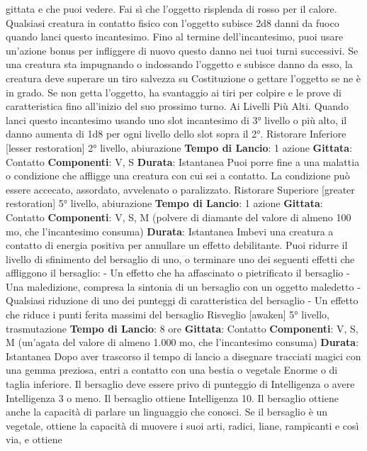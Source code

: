 \begin{multicols}{2}
gittata e che puoi vedere. Fai sì che l’oggetto risplenda
di rosso per il calore. Qualsiasi creatura in contatto
fisico con l’oggetto subisce 2d8 danni da fuoco quando
lanci questo incantesimo. Fino al termine
dell’incantesimo, puoi usare un’azione bonus per
infliggere di nuovo questo danno nei tuoi turni
successivi.
Se una creatura sta impugnando o indossando l’oggetto
e subisce danno da esso, la creatura deve superare un
tiro salvezza su Costituzione o gettare l’oggetto se ne è
in grado. Se non getta l’oggetto, ha svantaggio ai tiri per
colpire e le prove di caratteristica fino all’inizio del suo
prossimo turno.
Ai Livelli Più Alti. Quando lanci questo incantesimo
usando uno slot incantesimo di 3° livello o più alto, il
danno aumenta di 1d8 per ogni livello dello slot sopra il
2°.
Ristorare Inferiore
[lesser restoration]
2° livello, abiurazione
\textbf{Tempo di Lancio}: 1 azione
\textbf{Gittata}: Contatto
\textbf{Componenti}: V, S
\textbf{Durata}: Istantanea
Puoi porre fine a una malattia o condizione che affligge
una creatura con cui sei a contatto. La condizione può
essere accecato, assordato, avvelenato o paralizzato.
Ristorare Superiore
[greater restoration]
5° livello, abiurazione
\textbf{Tempo di Lancio}: 1 azione
\textbf{Gittata}: Contatto
\textbf{Componenti}: V, S, M (polvere di diamante del valore di
almeno 100 mo, che l’incantesimo consuma)
\textbf{Durata}: Istantanea
Imbevi una creatura a contatto di energia positiva per
annullare un effetto debilitante. Puoi ridurre il livello di
sfinimento del bersaglio di uno, o terminare uno dei
seguenti effetti che affliggono il bersaglio:
- Un effetto che ha affascinato o pietrificato il
bersaglio
- Una maledizione, compresa la sintonia di un
bersaglio con un oggetto maledetto
- Qualsiasi riduzione di uno dei punteggi di
caratteristica del bersaglio
- Un effetto che riduce i punti ferita massimi del
bersaglio
Risveglio
[awaken]
5° livello, trasmutazione
\textbf{Tempo di Lancio}: 8 ore
\textbf{Gittata}: Contatto
\textbf{Componenti}: V, S, M (un’agata del valore di almeno
1.000 mo, che l’incantesimo consuma)
\textbf{Durata}: Istantanea
Dopo aver trascorso il tempo di lancio a disegnare
tracciati magici con una gemma preziosa, entri a
contatto con una bestia o vegetale Enorme o di taglia
inferiore. Il bersaglio deve essere privo di punteggio di
Intelligenza o avere Intelligenza 3 o meno. Il bersaglio
ottiene Intelligenza 10. Il bersaglio ottiene anche la
capacità di parlare un linguaggio che conosci. Se il
bersaglio è un vegetale, ottiene la capacità di muovere i
suoi arti, radici, liane, rampicanti e così via, e ottiene

\end{multicols}

